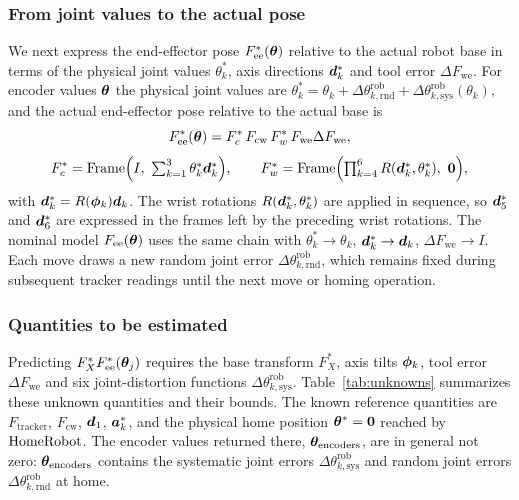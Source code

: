 \documentclass[../main.tex]{subfiles}
\begin{document}
\subsubsection{From joint values to the actual pose}\label{sec:math-robot}
We next express the end-effector pose $F^*_{\mathrm{ee}}(\bm{\theta})$ relative to the actual robot base in terms of the physical joint values $\theta^*_k$, axis directions $\bm{d}^*_k$ and tool error $\Delta F_{\mathrm{we}}$. For encoder values $\bm{\theta}$ the physical joint values are $\theta^*_k=\theta_k+\Delta\theta^{\mathrm{rob}}_{k,\mathrm{rnd}}+\Delta\theta^{\mathrm{rob}}_{k,\mathrm{sys}}(\theta_k)$, and the actual end-effector pose relative to the actual base is
\begin{equation}\label{eq:actual-fk}
F^*_{\mathrm{ee}}(\bm{\theta})=F^*_c\,F_{\mathrm{cw}}\,F^*_w\,F_{\mathrm{we}}\Delta F_{\mathrm{we}},
\end{equation}
\begin{equation*}
F^*_c=\Frame\Bigl(I,\ \textstyle\sum_{k=1}^{3}\theta^*_k\vct{d}^*_k\Bigr),\qquad
F^*_w=\Frame\Bigl(\textstyle\prod_{k=4}^{6}R(\vct{d}^*_k,\theta^*_k),\ \vct{0}\Bigr),
\end{equation*}
with $\bm{d}^*_k=R(\bm{\phi}_k)\bm{d}_k$. The wrist rotations $R(\bm{d}^*_k,\theta^*_k)$ are applied in sequence, so $\bm{d}^*_5$ and $\bm{d}^*_6$ are expressed in the frames left by the preceding wrist rotations. The nominal model $F_{\mathrm{ee}}(\bm{\theta})$ uses the same chain with $\theta^*_k\to\theta_k$, $\bm{d}^*_k\to\bm{d}_k$, $\Delta F_{\mathrm{we}}\to I$. Each move draws a new random joint error $\Delta\theta^{\mathrm{rob}}_{k,\mathrm{rnd}}$, which remains fixed during subsequent tracker readings until the next move or homing operation.

\subsubsection{Quantities to be estimated}
Predicting $F^*_X F^*_{\mathrm{ee}}(\bm{\theta}_j)$ requires the base transform $F^*_X$, axis tilts $\bm{\phi}_k$, tool error $\Delta F_{\mathrm{we}}$ and six joint-distortion functions $\Delta\theta^{\mathrm{rob}}_{k,\mathrm{sys}}$. Table~\ref{tab:unknowns} summarizes these unknown quantities and their bounds. The known reference quantities are $F_{\mathrm{tracker}}$, $F_{\mathrm{cw}}$, $\bm{d}_1$, $\bm{a}^*_k$, and the physical home position $\bm{\theta}^*=\bm{0}$ reached by $\operatorname{HomeRobot}$. The encoder values returned there, $\bm{\theta}_{\mathrm{encoders}}$, are in general not zero: $\bm{\theta}_{\mathrm{encoders}}$ contains the systematic joint errors $\Delta\theta^{\mathrm{rob}}_{k,\mathrm{sys}}$ and random joint errors $\Delta\theta^{\mathrm{rob}}_{k,\mathrm{rnd}}$ at home.
\end{document}
